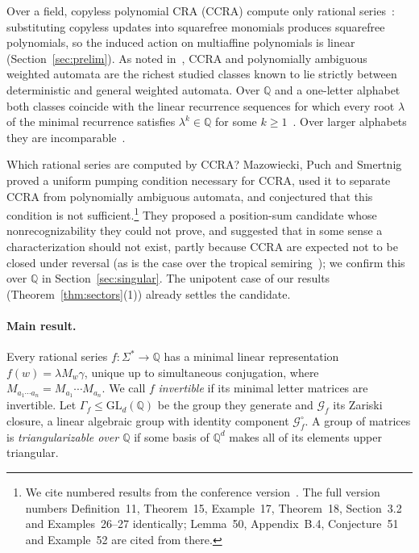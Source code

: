 \documentclass[11pt,letterpaper]{article}
\newcommand{\Q}{\mathbb{Q}}
\newcommand{\cG}{\mathcal{G}}
\newcommand{\GL}{\mathrm{GL}}
\theoremstyle{definition}
\begin{document}
Over a field, copyless polynomial CRA (CCRA) compute only rational series~\cite{MR16,MR19,MPS26}: substituting copyless updates into squarefree monomials produces squarefree polynomials, so the induced action on multiaffine polynomials is linear (Section~\ref{sec:prelim}). As noted in~\cite{MPS26}, CCRA and polynomially ambiguous weighted automata are the richest studied classes known to lie strictly between deterministic and general weighted automata. Over $\Q$ and a one-letter alphabet both classes coincide with the linear recurrence sequences for which every root $\lambda$ of the minimal recurrence satisfies $\lambda^k\in\Q$ for some $k\ge1$~\cite{BFLM22}. Over larger alphabets they are incomparable~\cite{MPS26}.

Which rational series are computed by CCRA? Mazowiecki, Puch and Smertnig~\cite{MPS26} proved a uniform pumping condition necessary for CCRA, used it to separate CCRA from polynomially ambiguous automata, and conjectured that this condition is not sufficient.\footnote{We cite numbered results from the conference version~\cite{MPS26}. The full version~\cite{MPSfull} numbers Definition~11, Theorem~15, Example~17, Theorem~18, Section~3.2 and Examples~26--27 identically; Lemma~50, Appendix~B.4, Conjecture~51 and Example~52 are cited from there.} They proposed a position-sum candidate whose nonrecognizability they could not prove, and suggested that in some sense a characterization should not exist, partly because CCRA are expected not to be closed under reversal (as is the case over the tropical semiring~\cite{MR16}); we confirm this over $\Q$ in Section~\ref{sec:singular}. The unipotent case of our results (Theorem~\ref{thm:sectors}(1)) already settles the candidate.

\paragraph{Main result.}
Every rational series $f:\Sigma^*\to\Q$ has a minimal linear representation $f(w)=\lambda M_w\gamma$, unique up to simultaneous conjugation, where $M_{a_1\cdots a_n}=M_{a_1}\cdots M_{a_n}$. We call $f$ \emph{invertible} if its minimal letter matrices are invertible. Let $\Gamma_f\le\GL_d(\Q)$ be the group they generate and $\cG_f$ its Zariski closure, a linear algebraic group with identity component $\cG_f^\circ$. A group of matrices is \emph{triangularizable over $\Q$} if some basis of $\Q^d$ makes all of its elements upper triangular.
\end{document}
